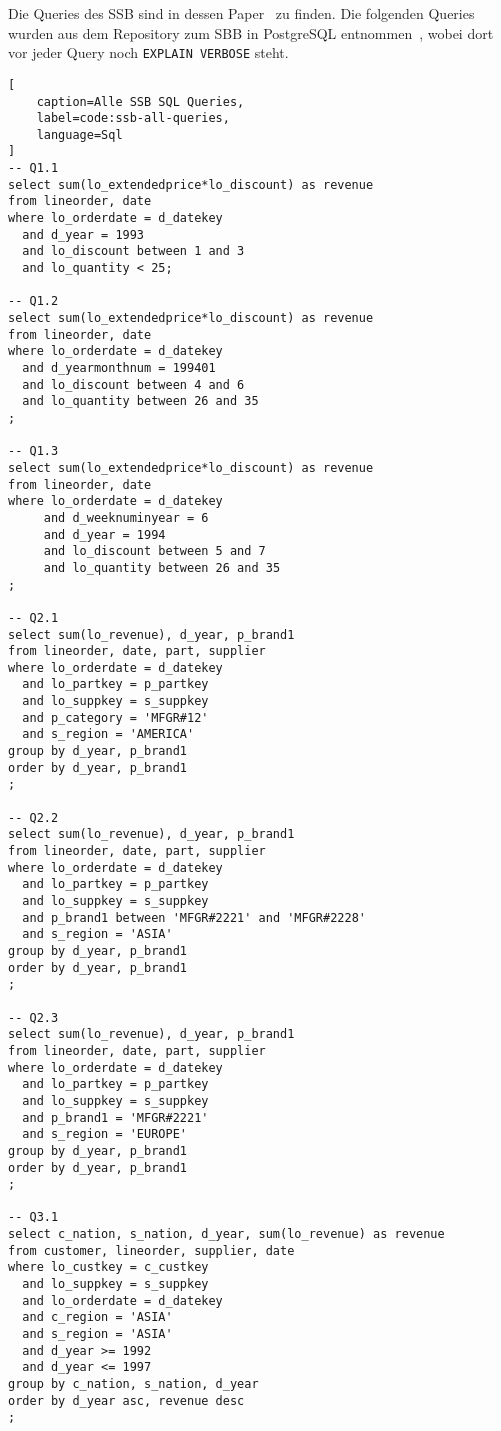 \label{sec:appendix-ssb-queries}
Die Queries des SSB sind in dessen Paper~\cite{oneil_star_2009} zu finden. Die folgenden Queries wurden aus dem Repository zum SBB in PostgreSQL entnommen~\cite{nukoyokohama_ssb-postgres_2023}, wobei dort vor jeder Query noch \lstinline|EXPLAIN VERBOSE| steht.
\begin{lstlisting}[
    caption=Alle SSB SQL Queries,
    label=code:ssb-all-queries,
    language=Sql
]
-- Q1.1
select sum(lo_extendedprice*lo_discount) as revenue   
from lineorder, date   
where lo_orderdate = d_datekey
  and d_year = 1993
  and lo_discount between 1 and 3
  and lo_quantity < 25;
 
-- Q1.2
select sum(lo_extendedprice*lo_discount) as revenue   
from lineorder, date   
where lo_orderdate = d_datekey
  and d_yearmonthnum = 199401
  and lo_discount between 4 and 6
  and lo_quantity between 26 and 35
;

-- Q1.3
select sum(lo_extendedprice*lo_discount) as revenue   
from lineorder, date   
where lo_orderdate = d_datekey
     and d_weeknuminyear = 6
     and d_year = 1994
     and lo_discount between 5 and 7
     and lo_quantity between 26 and 35
;

-- Q2.1
select sum(lo_revenue), d_year, p_brand1 
from lineorder, date, part, supplier 
where lo_orderdate = d_datekey
  and lo_partkey = p_partkey 
  and lo_suppkey = s_suppkey 
  and p_category = 'MFGR#12' 
  and s_region = 'AMERICA'
group by d_year, p_brand1
order by d_year, p_brand1
;

-- Q2.2
select sum(lo_revenue), d_year, p_brand1
from lineorder, date, part, supplier
where lo_orderdate = d_datekey
  and lo_partkey = p_partkey
  and lo_suppkey = s_suppkey
  and p_brand1 between 'MFGR#2221' and 'MFGR#2228'
  and s_region = 'ASIA'
group by d_year, p_brand1
order by d_year, p_brand1
;

-- Q2.3
select sum(lo_revenue), d_year, p_brand1
from lineorder, date, part, supplier
where lo_orderdate = d_datekey
  and lo_partkey = p_partkey
  and lo_suppkey = s_suppkey
  and p_brand1 = 'MFGR#2221'
  and s_region = 'EUROPE'
group by d_year, p_brand1
order by d_year, p_brand1
;

-- Q3.1
select c_nation, s_nation, d_year, sum(lo_revenue) as revenue
from customer, lineorder, supplier, date
where lo_custkey = c_custkey
  and lo_suppkey = s_suppkey
  and lo_orderdate = d_datekey
  and c_region = 'ASIA'
  and s_region = 'ASIA'
  and d_year >= 1992
  and d_year <= 1997
group by c_nation, s_nation, d_year
order by d_year asc, revenue desc
;
 

\end{lstlisting}

